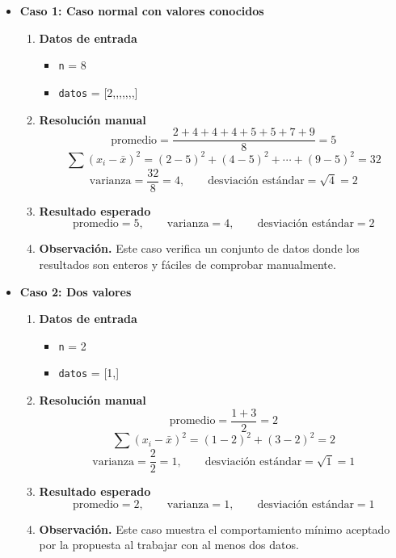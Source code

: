 \documentclass[12pt,twoside]{book}
\begin{document}
					\begin{itemize}
						
						\item \textbf{Caso 1: Caso normal con valores conocidos}
						\begin{enumerate}
							\item \textbf{Datos de entrada}
							\begin{itemize}
								\item \texttt{n} = 8
								\item \texttt{datos} = [2,\;4,\;4,,,,,]
							\end{itemize}
							\item \textbf{Resolución manual}
							\[
							\text{promedio}=\frac{2+4+4+4+5+5+7+9}{8}=5
							\]
							\[
							\sum (x_i-\bar{x})^2 = (2-5)^2+(4-5)^2+\cdots+(9-5)^2 = 32
							\]
							\[
							\text{varianza}=\frac{32}{8}=4,\qquad
							\text{desviación estándar}=\sqrt{4}=2
							\]
							\item \textbf{Resultado esperado}
							\[
							\text{promedio}=5,\qquad \text{varianza}=4,\qquad \text{desviación estándar}=2
							\]
							\item \textbf{Observación.} Este caso verifica un conjunto de datos donde los resultados son enteros y fáciles de comprobar manualmente.
						\end{enumerate}
						
						
						\item \textbf{Caso 2: Dos valores}
						\begin{enumerate}
							\item \textbf{Datos de entrada}
							\begin{itemize}
								\item \texttt{n} = 2
								\item \texttt{datos} = [1,]
							\end{itemize}
							\item \textbf{Resolución manual}
							\[
							\text{promedio}=\frac{1+3}{2}=2
							\]
							\[
							\sum (x_i-\bar{x})^2 = (1-2)^2+(3-2)^2 = 2
							\]
							\[
							\text{varianza}=\frac{2}{2}=1,\qquad
							\text{desviación estándar}=\sqrt{1}=1
							\]
							\item \textbf{Resultado esperado}
							\[
							\text{promedio}=2,\qquad \text{varianza}=1,\qquad \text{desviación estándar}=1
							\]
							\item \textbf{Observación.} Este caso muestra el comportamiento mínimo aceptado por la propuesta al trabajar con al menos dos datos.
						\end{enumerate}
						

\end{itemize}
\end{document}
